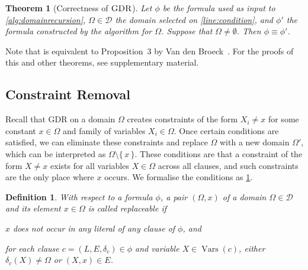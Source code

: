 \documentclass{article}
\newtheorem{theorem}{Theorem}
\newtheorem{definition}{Definition}
\DeclareMathOperator{\GDR}{\textsc{GDR}}
\DeclareMathOperator{\Vars}{Vars}
\begin{document}
\begin{theorem}[Correctness of $\GDR$]\label{thm:correctness1}
  Let $\phi$ be the formula used as input to \cref{alg:domainrecursion},
  $\Omega \in \mathcal{D}$ the domain selected on \cref{line:condition}, and
  $\phi'$ the formula constructed by the algorithm for $\Omega$. Suppose that
  $\Omega \ne \emptyset$. Then $\phi \equiv \phi'$.
\end{theorem}

Note that  is equivalent to Proposition~3 by Van den
Broeck~. For the proofs of this and other
theorems, see supplementary material.

\subsection{Constraint Removal}\label{sec:cr}

Recall that GDR on a domain $\Omega$ creates constraints of the form $X_i \ne x$
for some constant $x \in \Omega$ and family of variables $X_i \in \Omega$. Once
certain conditions are satisfied, we can eliminate these constraints and replace
$\Omega$ with a new domain $\Omega'$, which can be interpreted as
$\Omega \setminus \{\, x \,\}$. These conditions are that a constraint of the
form $X \ne x$ exists for all variables $X \in \Omega$ across all clauses, and
such constraints are the only place where $x$ occurs. We formalise the
conditions as \cref{def:replaceable}.

\begin{definition}\label{def:replaceable}
  With respect to a formula $\phi$, a pair $(\Omega, x)$ of a domain
  $\Omega \in \mathcal{D}$ and its element $x \in \Omega$ is called
  \emph{replaceable} if
  \begin{enumerate*}[label=(\roman*)]
    \item $x$ does not occur in any literal of any clause of $\phi$, and
    \item for each clause $c = (L, E, \delta_c) \in \phi$ and variable
    $X \in \Vars(c)$, either $\delta_c(X) \ne \Omega$ or $(X, x) \in E$.
  \end{enumerate*}
\end{definition}
\end{document}
